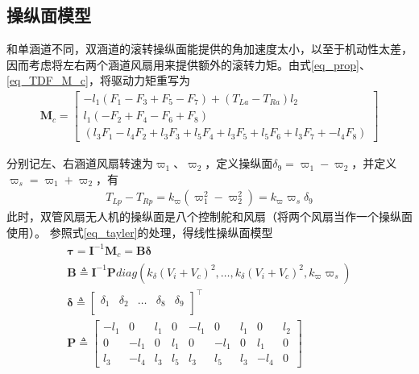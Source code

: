 \subsection{操纵面模型}
和单涵道不同，双涵道的滚转操纵面能提供的角加速度太小，以至于机动性太差，因而考虑将左右两个涵道风扇用来提供额外的滚转力矩。由式\eqref{eq_prop}、\eqref{eq_TDF_M_c}，将驱动力矩重写为
\begin{align}
\bm{M}_{c}=
\begin{bmatrix}
-{{l}_{1}}\left(F_1-F_3+F_5-F_7\right) +(T_{La}-T_{Ra})l_2 \\
{{l}_{1}}\left(-F_2+F_4-F_6+F_8\right) \\
\left(l_3 F_{1} - l_4 F_{2} + l_3 F_{3} + l_5 F_{4} + l_3 F_5 + l_5 F_6 + l_3 F_7 + -l_4 F_8 \right)
\end{bmatrix}	\label{eq_new_TDF_M_c}
\end{align}	

分别记左、右涵道风扇转速为$ \varpi_{{1}} $、$ \varpi_{{2}} $，定义操纵面$\delta_9=\varpi_{{1}}-\varpi_{{2}}$，并定义 $\varpi _{{s}}=\varpi_{{1}}+\varpi_{{2}}$，有
\begin{align}
T_{Lp}- T_{Rp} = k_{\varpi}\left( \varpi _{{1}}^{2}-\varpi _{{2}}^{2} \right)= k_{\varpi} \varpi_{{s}}  \delta_9
\end{align}
此时，双管风扇无人机的操纵面是八个控制舵和风扇（将两个风扇当作一个操纵面使用）。 参照式\eqref{eq_tayler}的处理，得线性操纵面模型
\begin{gather}
\bm{\tau}=\bm{I}^{-1}\bm{M}_{ {c}}=\bm{B}\bm{\delta}	\\
\bm{B}\triangleq \bm{I}^{-1}\bm{P}diag\left( k_{\delta} (V_i+V_c)^2,\ldots ,k_{\delta} (V_i+V_c)^2, k_{\varpi}\varpi_s \right) \\
\bm{\delta}\triangleq {\left[ 
	\begin{matrix}
	\delta_1 & \delta_2 & \ldots  & \delta_8 & \delta_9  \\
	\end{matrix} \right]}^\top	\\
\bm{P} \triangleq \begin{bmatrix}
-l_{1} & 0 & l_{1} & 0 & -l_{1} & 0 & l_{1} & 0 & l_2\\
0 & -l_{1} & 0 & l_{1} & 0 & -l_{1} & 0 & l_{1}  &0\\
l_{3} & -l_{4} & l_{3} & l_{5} & l_{3} & l_{5} & l_{3} & -l_{4}&0 
\end{bmatrix}
\end{gather}

